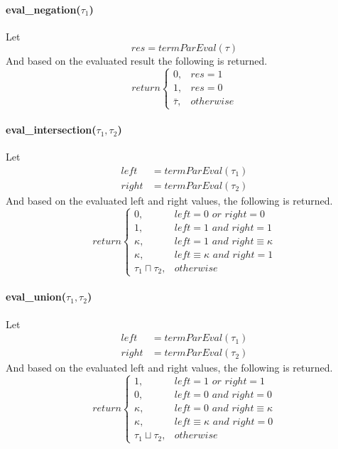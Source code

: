 \documentclass{article}
\begin{document}
		\paragraph{eval\_negation($\tau_1$)} Let
			\begin{equation}
				res = termParEval(\tau)
			\end{equation}
		\newline
		And based on the evaluated result the following is returned.
\[return  \begin{cases} 
      0, & res = 1 \\
      1, & res = 0 \\
      \bar{\tau}, & otherwise 
   \end{cases}
\]

		\paragraph{eval\_intersection($\tau_1, \tau_2$)}Let
			\begin{align*}
				left &= termParEval(\tau_1) \\
				right &= termParEval(\tau_2)
			\end{align*}
		\newline
		And based on the evaluated left and right values, the following is returned.
\[return  \begin{cases} 
      0, & left = 0 \textit{  or  } right = 0 \\
      1, & left = 1  \textit{  and  } right = 1 \\
      \kappa, & left = 1  \textit{  and  } right \equiv \kappa \\
      \kappa, & left \equiv \kappa  \textit{  and  } right = 1\\
      \tau_1 \sqcap \tau_2, & otherwise 
   \end{cases}
\]

		\paragraph{eval\_union($\tau_1, \tau_2$)} Let
			\begin{align*}
				left &= termParEval(\tau_1) \\
				right &= termParEval(\tau_2)
			\end{align*}
		\newline
		And based on the evaluated left and right values, the following is returned.
\[return  \begin{cases} 
      1, & left = 1 \textit{  or  } right = 1 \\
      0, & left = 0  \textit{  and  } right = 0 \\
      \kappa, & left = 0  \textit{  and  } right \equiv \kappa \\
      \kappa, & left \equiv \kappa  \textit{  and  } right = 0\\
      \tau_1 \sqcup \tau_2, & otherwise 
   \end{cases}
\]
\end{document}
